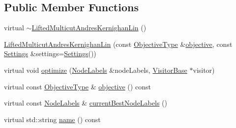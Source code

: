 \subsection*{Public Member Functions}
\begin{DoxyCompactItemize}
\item 
virtual \hyperlink{classnifty_1_1graph_1_1lifted__multicut_1_1LiftedMulticutAndresKernighanLin_aab5617a5a775da7c773c1e79f2411365}{$\sim$\+Lifted\+Multicut\+Andres\+Kernighan\+Lin} ()
\item 
\hyperlink{classnifty_1_1graph_1_1lifted__multicut_1_1LiftedMulticutAndresKernighanLin_a62d7a0a8439ba6160dd3f232992a8ff9}{Lifted\+Multicut\+Andres\+Kernighan\+Lin} (const \hyperlink{classnifty_1_1graph_1_1lifted__multicut_1_1LiftedMulticutAndresKernighanLin_ac7e43ca279b2efcbc2ebef1e7fed5816}{Objective\+Type} \&\hyperlink{classnifty_1_1graph_1_1lifted__multicut_1_1LiftedMulticutAndresKernighanLin_a8919b6ba352f53db3d2123d5b7fca300}{objective}, const \hyperlink{structnifty_1_1graph_1_1lifted__multicut_1_1LiftedMulticutAndresKernighanLin_1_1Settings}{Settings} \&settings=\hyperlink{structnifty_1_1graph_1_1lifted__multicut_1_1LiftedMulticutAndresKernighanLin_1_1Settings}{Settings}())
\item 
virtual void \hyperlink{classnifty_1_1graph_1_1lifted__multicut_1_1LiftedMulticutAndresKernighanLin_ab8f1294b901bcf167bdcac777ff95d22}{optimize} (\hyperlink{classnifty_1_1graph_1_1lifted__multicut_1_1LiftedMulticutAndresKernighanLin_a03cd7122bcfadca7b44c2ed143355289}{Node\+Labels} \&node\+Labels, \hyperlink{classnifty_1_1graph_1_1lifted__multicut_1_1LiftedMulticutAndresKernighanLin_ab9331c2df1e0f0271899de4529631965}{Visitor\+Base} $\ast$visitor)
\item 
virtual const \hyperlink{classnifty_1_1graph_1_1lifted__multicut_1_1LiftedMulticutAndresKernighanLin_ac7e43ca279b2efcbc2ebef1e7fed5816}{Objective\+Type} \& \hyperlink{classnifty_1_1graph_1_1lifted__multicut_1_1LiftedMulticutAndresKernighanLin_a8919b6ba352f53db3d2123d5b7fca300}{objective} () const 
\item 
virtual const \hyperlink{classnifty_1_1graph_1_1lifted__multicut_1_1LiftedMulticutAndresKernighanLin_a03cd7122bcfadca7b44c2ed143355289}{Node\+Labels} \& \hyperlink{classnifty_1_1graph_1_1lifted__multicut_1_1LiftedMulticutAndresKernighanLin_af0cff8d004fa48cbc0d127de9c705e4e}{current\+Best\+Node\+Labels} ()
\item 
virtual std\+::string \hyperlink{classnifty_1_1graph_1_1lifted__multicut_1_1LiftedMulticutAndresKernighanLin_abcc8564fd9e78573579058ac0e548ad1}{name} () const 
\end{DoxyCompactItemize}


